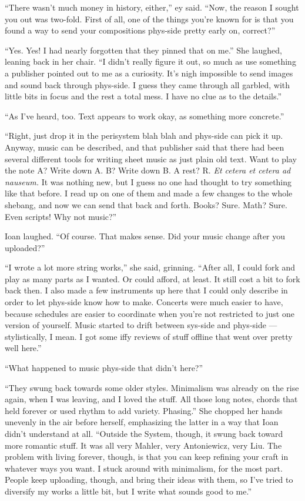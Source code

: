 ``There wasn't much money in history, either,'' ey said. ``Now, the reason I sought you out was two-fold. First of all, one of the things you're known for is that you found a way to send your compositions phys-side pretty early on, correct?''

``Yes. Yes! I had nearly forgotten that they pinned that on me.'' She laughed, leaning back in her chair. ``I didn't really figure it out, so much as use something a publisher pointed out to me as a curiosity. It's nigh impossible to send images and sound back through phys-side. I guess they came through all garbled, with little bits in focus and the rest a total mess. I have no clue as to the details.''

``As I've heard, too. Text appears to work okay, as something more concrete.''

``Right, just drop it in the perisystem blah blah and phys-side can pick it up. Anyway, music can be described, and that publisher said that there had been several different tools for writing sheet music as just plain old text. Want to play the note A? Write down A. B? Write down B. A rest? R. \emph{Et cetera et cetera ad nauseum.} It was nothing new, but I guess no one had thought to try something like that before. I read up on one of them and made a few changes to the whole shebang, and now we can send that back and forth. Books? Sure. Math? Sure. Even scripts! Why not music?''

Ioan laughed. ``Of course. That makes sense. Did your music change after you uploaded?''

``I wrote a lot more string works,'' she said, grinning. ``After all, I could fork and play as many parts as I wanted. Or could afford, at least. It still cost a bit to fork back then. I also made a few instruments up here that I could only describe in order to let phys-side know how to make. Concerts were much easier to have, because schedules are easier to coordinate when you're not restricted to just one version of yourself. Music started to drift between sys-side and phys-side — stylistically, I mean. I got some iffy reviews of stuff offline that went over pretty well here.''

``What happened to music phys-side that didn't here?''

``They swung back towards some older styles. Minimalism was already on the rise again, when I was leaving, and I loved the stuff. All those long notes, chords that held forever or used rhythm to add variety. Phasing.'' She chopped her hands unevenly in the air before herself, emphasizing the latter in a way that Ioan didn't understand at all. ``Outside the System, though, it swung back toward more romantic stuff. It was all very Mahler, very Antoniewicz, very Liu. The problem with living forever, though, is that you can keep refining your craft in whatever ways you want. I stuck around with minimalism, for the most part. People keep uploading, though, and bring their ideas with them, so I've tried to diversify my works a little bit, but I write what sounds good to me.''

